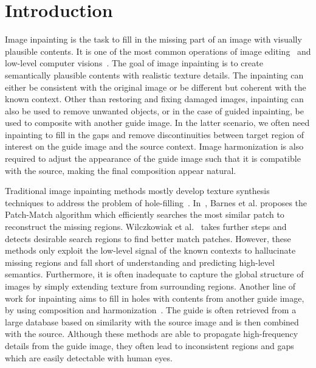 \section{Introduction}
Image inpainting is the task to fill in the missing part of an image with visually plausible contents. It is one of the most common operations of image editing~\cite{gatys2015texture} and low-level computer visions~\cite{komodakis2006image,hays2007scene}. The goal of image inpainting is to create semantically plausible contents with realistic texture details. The inpainting can either be consistent with the original image or be different but coherent with the known context. Other than restoring and fixing damaged images, inpainting can also be used to remove unwanted objects, or in the case of guided inpainting, be used to composite with another guide image. In the latter scenario, we often need inpainting to fill in the gaps and remove discontinuities between target region of interest on the guide image and the source context. Image harmonization is also required to adjust the appearance of the guide image such that it is compatible with the source, making the final composition appear natural. 

Traditional image inpainting methods mostly develop texture synthesis techniques to address the problem of hole-filling~\cite{bertalmio2000image,komodakis2006image,wexler2004space,barnes2009patchmatch,bertalmio2003simultaneous,wilczkowiak2005hole}. In~\cite{barnes2009patchmatch}, Barnes et al. proposes the Patch-Match algorithm which efficiently searches the most similar patch to reconstruct the missing regions. Wilczkowiak et al.~\cite{wilczkowiak2005hole} takes further steps and detects desirable search regions to find better match patches. However, these methods only exploit the low-level signal of the known contexts to hallucinate missing regions and fall short of understanding and predicting high-level semantics. Furthermore, it is often inadequate to capture the global structure of images by simply extending texture from surrounding regions. Another line of work for inpainting aims to fill in holes with contents from another guide image, by using composition and harmonization~\cite{hays2007scene,tsai2017deep}. The guide is often retrieved from a large database based on similarity with the source image and is then combined with the source. Although these methods are able to propagate high-frequency details from the guide image, they often lead to inconsistent regions and gaps which are easily detectable with human eyes.  

